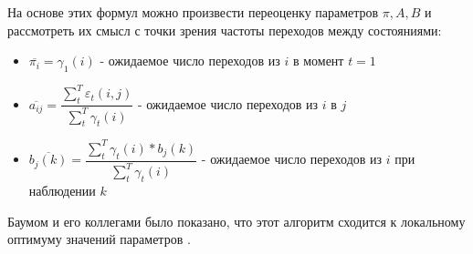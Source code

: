 На основе этих формул можно произвести переоценку параметров $\pi, A, B$ и рассмотреть их смысл с точки зрения частоты переходов между состояниями:

\begin{itemize}
\item $\overline{\pi_i}=\gamma_1(i)$ - ожидаемое число переходов из $i$ в момент $t=1$
\item $\overline{a_{ij}}=\dfrac{\sum_t^T\varepsilon_t(i,j)}{\sum_t^T\gamma_t(i)}$ - ожидаемое число переходов из $i$ в $j$
\item $\overline{b_{j}(k)}=\dfrac{\sum_t^T\gamma_t(i)*b_j(k)}{\sum_t^T\gamma_t(i)}$ - ожидаемое число переходов из $i$ при наблюдении $k$
\end{itemize}

Баумом и его коллегами было показано, что этот алгоритм сходится к локальному оптимуму значений параметров \cite{hmm_conv_proof}.
